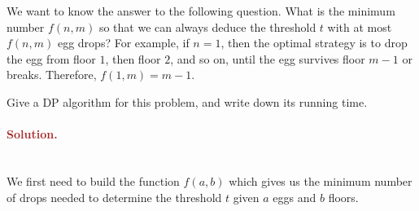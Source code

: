 We want to know the answer to the following question. What is the minimum number $f(n, m)$ so that we can always deduce the threshold $t$ with at most $f(n, m)$ egg drops? For example, if $n = 1$, then the optimal strategy is to drop the egg from floor $1$, then floor $2$, and so on, until the egg survives floor $m - 1$ or breaks. Therefore, $f(1, m) = m - 1$.

Give a DP algorithm for this problem, and write down its running time.

\paragraph{\textcolor{brown}{Solution.}} \: \\
We first need to build the function $f(a, b)$ which gives us the minimum number of drops needed to determine the threshold $t$ given $a$ eggs and $b$ floors. 

